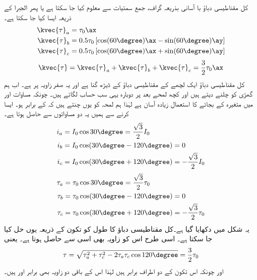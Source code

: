 کل مقناطیسی دباؤ با آسانی بذریعہ گراف، جمع سمتیات  سے معلوم کیا جا سکتا ہے یا پھر الجبرا کے ذریعہ ایسا کیا جا سکتا ہے۔
\begin{gather}
\begin{aligned}
\kvec{\tau}_a&=\tau_0 \ax\\
\kvec{\tau}_b&=0.5 \tau_0 \left[\cos (60\degree) \ax-\sin (60\degree)\ay \right]\\
\kvec{\tau}_c&=0.5 \tau_0 \left[\cos (60\degree) \ax+\sin (60\degree)\ay \right]
\end{aligned}
\end{gather}
%
\begin{align}
\kvec{\tau}=\kvec{\tau}_a+\kvec{\tau}_b+\kvec{\tau}_c=\frac{3}{2} \tau_0 \ax
\end{align}
کل مقناطیسی دباؤ ایک لچھے کے مقناطیسی دباؤ کے ڈیڑھ گنا ہے اور یہ صفر زاویہ پر ہے۔ اب ہم گھڑی کو چلنے دیتے ہیں اور کچھ لمحے بعد  پر دوبارہ یہی سب حساب لگاتے ہیں۔ چونکہ مساوات  اور  میں متغیرہ  کے بجائے  کا استعمال زیادہ آسان ہے لہٰذا ہم لمحہ  کو یوں چنتے ہیں کہ   کے برابر ہو۔ ایسا کرنے سے ہمیں یہ دو مساواتوں سے حاصل ہوتا ہے۔
\begin{gather}
\begin{aligned}
i_a&=I_0 \cos 30\degree=\frac{\sqrt{3}}{2} I_0\\
i_b&=I_0 \cos (30\degree-120\degree)=0\\
i_c&=I_0 \cos (30\degree+120\degree)=-\frac{\sqrt{3}}{2} I_0
\end{aligned}
\end{gather}
%
\begin{gather}
\begin{aligned}
\tau_a&=\tau_0 \cos 30\degree=\frac{\sqrt{3}}{2} \tau_0\\
\tau_b&=\tau_0 \cos (30\degree-120\degree)=0\\
\tau_c&=\tau_0 \cos (30\degree+120\degree)=-\frac{\sqrt{3}}{2} \tau_0
\end{aligned}
\end{gather}
یہ شکل  میں دکھایا گیا ہے۔کل مقناطیسی دباؤ کا طول  کو تکون کے ذریعہ یوں حل کیا جا سکتا ہے۔ اسی طرح اس کو زاویہ بھی اسی سے حاصل ہوتا ہے۔ یعنی
\begin{align}
\tau=\sqrt{\tau_a^2+\tau_c^2-2 \tau_a \tau_c \cos 120\degree}=\frac{3}{2}\tau_0
\end{align}
اور چونکہ اس تکون کے دو اطراف برابر ہیں لہٰذا اس کے باقی دو زاویہ بھی برابر اور  ہیں۔

